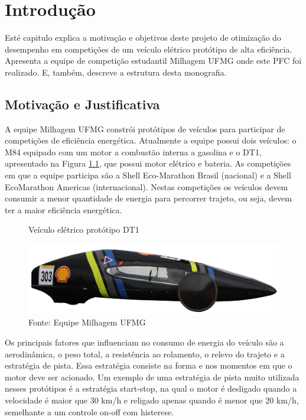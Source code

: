 \chapter{Introdução}
\label{chap:intro}
\thispagestyle{empty}

Esté capitulo explica a motivação e objetivos deste projeto de otimização do desempenho em competições de um veículo elétrico protótipo de alta eficiência.
Apresenta a equipe de competição estudantil Milhagem UFMG onde este PFC foi realizado. E, também, descreve a estrutura desta monografia.

\section{Motivação e Justificativa}
\label{sec:motivacao}

A equipe Milhagem UFMG constrói protótipos de veículos para participar de competições
de eficiência energética. Atualmente a equipe possui dois veículos: o M84 equipado com um motor a combustão interna a gasolina e o DT1,
 apresentado na Figura \ref{fig:DT1}, que possui motor elétrico e bateria. As competições em que a
equipe participa são a Shell Eco-Marathon Brasil (nacional) e a Shell EcoMarathon Americas (internacional).
Nestas competições os veículos devem consumir a
menor quantidade de energia para percorrer trajeto, ou seja, devem ter a maior eficiência
energética.

\begin{figure}[h]
    \centering
    \caption{Veículo elétrico protótipo DT1}
    \label{fig:DT1}
    \includegraphics[scale=0.11]{Introducao/Figuras/dt1.png}
    \caption*{\footnotesize{Fonte: Equipe Milhagem UFMG}}
\end{figure}

Os principais fatores que influenciam no consumo de energia do veículo são a
aerodinâmica, o peso total, a resistência ao rolamento, o relevo do trajeto e a estratégia
de pista. Essa estratégia consiste na forma e nos momentos em que o motor deve ser
acionado. Um exemplo de uma estratégia de pista muito utilizada nesses protótipos é a
estratégia start-stop, na qual o motor é desligado quando a velocidade é maior que 30
km/h e religado apenas quando é menor que 20 km/h, semelhante a um controle on-off
com histerese.

